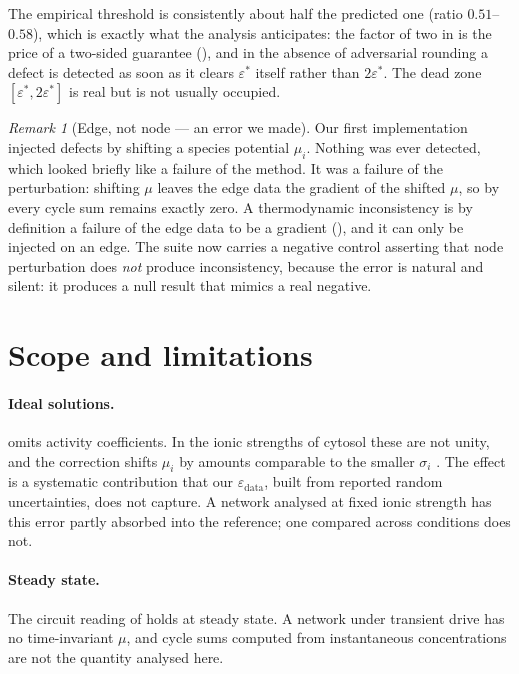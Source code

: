 \documentclass[11pt,twocolumn,a4paper]{article}
\theoremstyle{pstyle}
\theoremstyle{definition}
\theoremstyle{remark}
\newtheorem{remark}[theorem]{Remark}
\newcommand{\eps}{\varepsilon}
\newcommand{\epsdata}{\eps_{\mathrm{data}}}
\newcommand{\epsstar}{\eps^{\ast}}
\begin{document}
The empirical threshold is consistently about half the predicted one
(ratio $0.51$--$0.58$), which is exactly what the analysis anticipates:
the factor of two in  is the price of a two-sided
guarantee (), and in the absence of adversarial
rounding a defect is detected as soon as it clears $\epsstar$ itself
rather than $2\epsstar$. The dead zone $[\epsstar,2\epsstar]$ is real
but is not usually occupied.



\begin{remark}[Edge, not node --- an error we made]
\label{rem:edge-not-node}
Our first implementation injected defects by shifting a species
potential $\mu_i$. Nothing was ever detected, which looked briefly like
a failure of the method. It was a failure of the perturbation: shifting
$\mu$ leaves the edge data the gradient of the shifted $\mu$, so by
 every cycle sum remains exactly zero. A thermodynamic
inconsistency is by definition a failure of the edge data to be a
gradient (), and it can only be injected on an edge.
The suite now carries a negative control asserting that node
perturbation does \emph{not} produce inconsistency, because the error is
natural and silent: it produces a null result that mimics a real
negative.
\end{remark}

\section{Scope and limitations}
\label{sec:limits}

\paragraph{Ideal solutions.}  omits activity coefficients.
In the ionic strengths of cytosol these are not unity, and the
correction shifts $\mu_i$ by amounts comparable to the smaller
$\sigma_i$ \citep{alberty1998}. The effect is a systematic contribution
that our $\epsdata$, built from reported random uncertainties, does not
capture. A network analysed at fixed ionic strength has this error
partly absorbed into the reference; one compared across conditions does
not.

\paragraph{Steady state.} The circuit reading of
 holds at steady state. A network under transient
drive has no time-invariant $\mu$, and cycle sums computed from
instantaneous concentrations are not the quantity analysed here.
\end{document}
